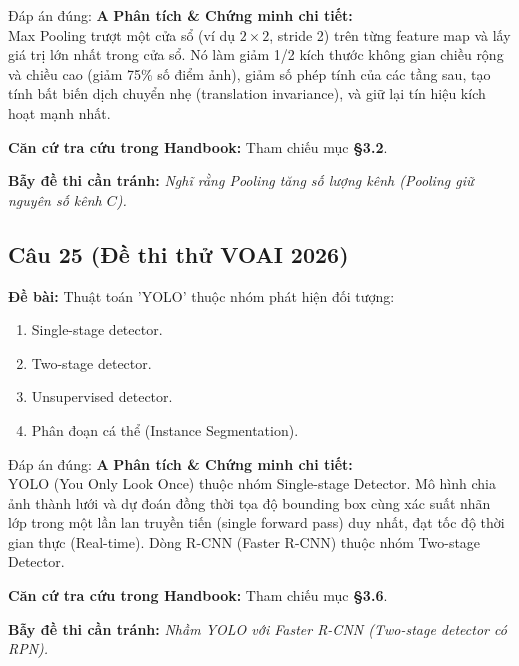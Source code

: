 \documentclass[10pt,a4paper]{article}
\begin{document}
\begin{solbox}{Đáp án đúng: \textbf{A}}
\textbf{Phân tích \& Chứng minh chi tiết:} \\
Max Pooling trượt một cửa sổ (ví dụ $2 \times 2$, stride 2) trên từng feature map và lấy giá trị lớn nhất trong cửa sổ. Nó làm giảm 1/2 kích thước không gian chiều rộng và chiều cao (giảm 75\% số điểm ảnh), giảm số phép tính của các tầng sau, tạo tính bất biến dịch chuyển nhẹ (translation invariance), và giữ lại tín hiệu kích hoạt mạnh nhất.

\vspace{0.4em}
\textbf{Căn cứ tra cứu trong Handbook:} Tham chiếu mục \textbf{§3.2}.

\vspace{0.4em}
\textbf{Bẫy đề thi cần tránh:} \textit{Nghĩ rằng Pooling tăng số lượng kênh (Pooling giữ nguyên số kênh $C$).}
\end{solbox}
\vspace{0.5em}


\subsection*{Câu 25 (Đề thi thử VOAI 2026)}
\textbf{Đề bài:} Thuật toán 'YOLO' thuộc nhóm phát hiện đối tượng:

\begin{enumerate}[label=\textbf{\Alph*.}]
    \item Single-stage detector.
    \item Two-stage detector.
    \item Unsupervised detector.
    \item Phân đoạn cá thể (Instance Segmentation).
\end{enumerate}

\begin{solbox}{Đáp án đúng: \textbf{A}}
\textbf{Phân tích \& Chứng minh chi tiết:} \\
YOLO (You Only Look Once) thuộc nhóm Single-stage Detector. Mô hình chia ảnh thành lưới và dự đoán đồng thời tọa độ bounding box cùng xác suất nhãn lớp trong một lần lan truyền tiến (single forward pass) duy nhất, đạt tốc độ thời gian thực (Real-time). Dòng R-CNN (Faster R-CNN) thuộc nhóm Two-stage Detector.

\vspace{0.4em}
\textbf{Căn cứ tra cứu trong Handbook:} Tham chiếu mục \textbf{§3.6}.

\vspace{0.4em}
\textbf{Bẫy đề thi cần tránh:} \textit{Nhầm YOLO với Faster R-CNN (Two-stage detector có RPN).}
\end{solbox}
\vspace{0.5em}
\end{document}
